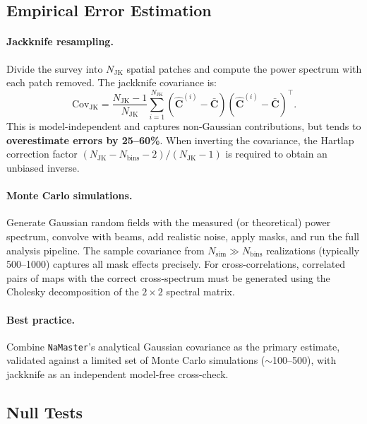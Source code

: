 \documentclass[10pt,a4paper]{article}
\begin{document}
\subsection{Empirical Error Estimation}

\paragraph{Jackknife resampling.}
Divide the survey into $N_{\mathrm{JK}}$ spatial patches and compute the power spectrum with each patch removed. The jackknife covariance is:
\begin{equation}
\mathrm{Cov}_{\mathrm{JK}} = \frac{N_{\mathrm{JK}}-1}{N_{\mathrm{JK}}}
\sum_{i=1}^{N_{\mathrm{JK}}}
\left(\hat{\mathbf{C}}^{(i)} - \bar{\mathbf{C}}\right)
\left(\hat{\mathbf{C}}^{(i)} - \bar{\mathbf{C}}\right)^\top.
\label{eq:jackknife}
\end{equation}
This is model-independent and captures non-Gaussian contributions, but tends to \textbf{overestimate errors by 25--60\%}. When inverting the covariance, the Hartlap correction factor $(N_{\mathrm{JK}} - N_{\mathrm{bins}} - 2)/(N_{\mathrm{JK}} - 1)$ is required to obtain an unbiased inverse.

\paragraph{Monte Carlo simulations.}
Generate Gaussian random fields with the measured (or theoretical) power spectrum, convolve with beams, add realistic noise, apply masks, and run the full analysis pipeline. The sample covariance from $N_{\mathrm{sim}} \gg N_{\mathrm{bins}}$ realizations (typically 500--1000) captures all mask effects precisely. For cross-correlations, correlated pairs of maps with the correct cross-spectrum must be generated using the Cholesky decomposition of the $2 \times 2$ spectral matrix.

\paragraph{Best practice.}
Combine \texttt{NaMaster}'s analytical Gaussian covariance as the primary estimate, validated against a limited set of Monte Carlo simulations ($\sim$100--500), with jackknife as an independent model-free cross-check.


\subsection{Null Tests}
\end{document}
